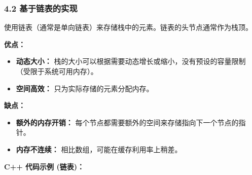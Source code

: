 \subsubsection{4.2 基于链表的实现}

使用链表（通常是单向链表）来存储栈中的元素。链表的头节点通常作为栈顶。

\textbf{优点：}

\begin{itemize}
	\item \textbf{动态大小：} 栈的大小可以根据需要动态增长或缩小，没有预设的容量限制（受限于系统可用内存）。
	\item \textbf{空间高效：} 只为实际存储的元素分配内存。
\end{itemize}

\textbf{缺点：}

\begin{itemize}
	\item \textbf{额外的内存开销：} 每个节点都需要额外的空间来存储指向下一个节点的指针。
	\item \textbf{内存不连续：} 相比数组，可能在缓存利用率上稍差。
\end{itemize}

\textbf{C++ 代码示例 (链表)：}

